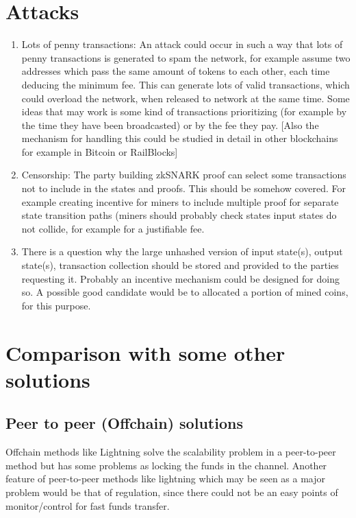 \documentclass{article}
\begin{document}
\section{Attacks}

\begin{enumerate}
\item Lots of penny transactions: An attack could occur in such a way that lots of penny transactions is generated to spam the network, for example assume two addresses which pass the same amount of tokens to each other, each time deducing the minimum fee. This can generate lots of valid transactions, which could overload the network, when released to network at the same time. Some ideas that may work is some kind of transactions prioritizing (for example by the time they have been broadcasted) or by the fee they pay. [Also the mechanism for handling this could be studied in detail in other blockchains for example in Bitcoin or RailBlocks]

\item Censorship: The party building zkSNARK proof can select some transactions not to include in the states and proofs. This should be somehow covered.  For example creating incentive for miners to include multiple proof for separate state transition paths (miners should probably check states input states do not collide, for example for a justifiable fee.

\item There is a question why the large unhashed version of input state(s), output state(s), transaction collection should be stored and provided to the parties requesting it. Probably an incentive mechanism could be designed for doing so. A possible good candidate would be to allocated a portion of mined coins, for this purpose.

\end{enumerate}

\section{Comparison with some other solutions}

\subsection{Peer to peer (Offchain) solutions}

Offchain methods like Lightning solve the scalability problem in a peer-to-peer method but has some problems as locking the funds in the channel. Another feature of peer-to-peer methods like lightning which may be seen as a major problem would be that of regulation, since there could not be an easy points of monitor/control for fast funds transfer.
\end{document}
